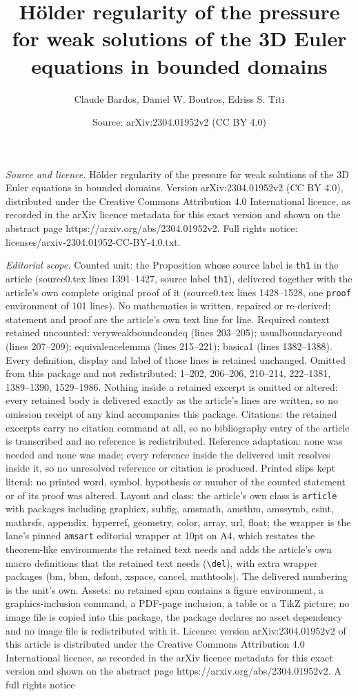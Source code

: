 \documentclass[10pt,a4paper]{amsart}
\title[H\"older regularity of the pressure for weak solutions of th]{H\"older regularity of the pressure for weak solutions of the 3D Euler equations in bounded domains}
\author{Claude Bardos, Daniel W. Boutros, Edriss S. Titi}
\date{Source: arXiv:2304.01952v2 (CC BY 4.0)}
\begin{document}
\maketitle

\noindent\emph{Source and licence.} H\"older regularity of the pressure for weak solutions of the 3D Euler equations in bounded domains. Version arXiv:2304.01952v2 (CC BY 4.0), distributed under the Creative Commons Attribution 4.0 International licence, as recorded in the arXiv licence metadata for this exact version and shown on the abstract page https://arxiv.org/abs/2304.01952v2. Full rights notice: licenses/arxiv-2304.01952-CC-BY-4.0.txt.\par\smallskip

\noindent\textit{Editorial scope.} Counted unit: the Proposition whose source label is \texttt{th1} in the article (source0.tex lines 1391--1427, source label \texttt{th1}), delivered together with the article's own complete original proof of it (source0.tex lines 1428--1528, one \texttt{proof} environment of 101 lines). No mathematics is written, repaired or re-derived: statement and proof are the article's own text line for line. Required context retained uncounted: veryweakboundcondeq (lines 203--205); usualboundarycond (lines 207--209); equivalencelemma (lines 215--221); basica1 (lines 1382--1388). Every definition, display and label of those lines is retained unchanged. Omitted from this package and not redistributed: 1--202, 206--206, 210--214, 222--1381, 1389--1390, 1529--1986. Nothing inside a retained excerpt is omitted or altered: every retained body is delivered exactly as the article's lines are written, so no omission receipt of any kind accompanies this package. Citations: the retained excerpts carry no citation command at all, so no bibliography entry of the article is transcribed and no reference is redistributed. Reference adaptation: none was needed and none was made; every reference inside the delivered unit resolves inside it, so no unresolved reference or citation is produced. Printed slips kept literal: no printed word, symbol, hypothesis or number of the counted statement or of its proof was altered. Layout and class: the article's own class is \texttt{article} with packages including graphicx, subfig, amsmath, amsthm, amssymb, esint, mathrsfs, appendix, hyperref, geometry, color, array, url, float; the wrapper is the lane's pinned \texttt{amsart} editorial wrapper at 10pt on A4, which restates the theorem-like environments the retained text needs and adds the article's own macro definitions that the retained text needs (\texttt{\textbackslash del}), with extra wrapper packages (bm, bbm, dsfont, xspace, cancel, mathtools). The delivered numbering is the unit's own. Assets: no retained span contains a figure environment, a graphics-inclusion command, a PDF-page inclusion, a table or a TikZ picture; no image file is copied into this package, the package declares no asset dependency and no image file is redistributed with it. Licence: version arXiv:2304.01952v2 of this article is distributed under the Creative Commons Attribution 4.0 International licence, as recorded in the arXiv licence metadata for this exact version and shown on the abstract page https://arxiv.org/abs/2304.01952v2. A full rights notice 
\end{document}
